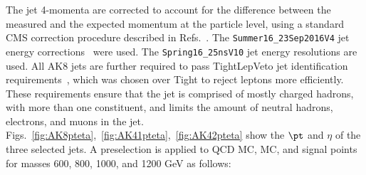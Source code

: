 The jet 4-momenta are corrected to account for the difference between the measured and the expected momentum at the particle level, using a standard CMS correction procedure described in Refs.~\cite{JINST6,CMS-DP-2013-011}. The \texttt{Summer16\_23Sep2016V4} jet energy corrections~\cite{JESUncertaintyTWiki} were used. The \texttt{Spring16\_25nsV10} jet energy resolutions are used.  All AK8 jets are further required to pass TightLepVeto jet identification requirements~\cite{JetID13TeVTWiki}, which was chosen over Tight to reject leptons more efficiently. These requirements ensure that the jet is comprised of mostly charged hadrons, with more than one constituent, and limits the amount of neutral hadrons, electrons, and muons in the jet.
Figs.~\ref{fig:AK8pteta},~\ref{fig:AK41pteta},~\ref{fig:AK42pteta} show the $\pt$ and $\eta$ of the three selected jets. A preselection is applied to QCD MC, \ttbar MC, and signal points for masses 600, 800, 1000, and 1200 GeV as follows:

